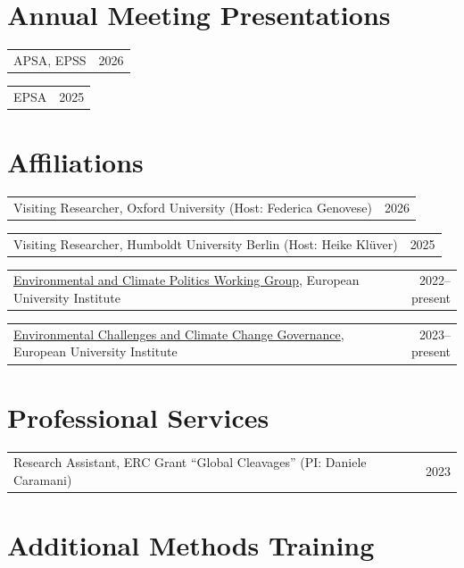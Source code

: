\documentclass[11pt,letterpaper]{article}
\makeatletter
\newcommand{\simpleitem}[2]{%
  \begin{tabularx}{\linewidth}{@{}X r@{}}
    #1 & {\color{muted}#2}\\
  \end{tabularx}\vspace{0.1em}
}
\makeatother
\begin{document}

\section{Annual Meeting Presentations}

\simpleitem{APSA, EPSS}{2026}
\simpleitem{EPSA}{2025}


\section{Affiliations}

\simpleitem{Visiting Researcher, Oxford University (Host: Federica Genovese)}{2026}
\simpleitem{Visiting Researcher, Humboldt University Berlin (Host: Heike Kl\"uver)}{2025}
\simpleitem{\href{https://www.eui.eu/research-hub?id=environmental-and-climate-politics-working-group}{Environmental and Climate Politics Working Group}, European University Institute}{2022--present}
\simpleitem{\href{https://www.eui.eu/research-hub?id=environmental-and-climate-governance}{Environmental Challenges and Climate Change Governance}, European University Institute}{2023--present}


\section{Professional Services}

\simpleitem{Research Assistant, ERC Grant \enquote{Global Cleavages} (PI: Daniele Caramani)}{2023}


\section{Additional Methods Training}
\end{document}

